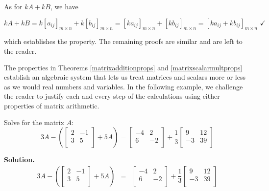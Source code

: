 \documentclass{ximera}
\begin{document}
As for $kA + kB$, we have

\[ kA + kB = k\left[a_{ij}\right]_{m \times n}+k\left[b_{ij}\right]_{m \times n} =  \left[ka_{ij}\right]_{m \times n}+\left[kb_{ij}\right]_{m \times n} = \left[ka_{ij} + kb_{ij}\right]_{m \times n} \, \, \checkmark \]

which establishes the property.  The remaining proofs are similar and are left to the reader.  


The properties in Theorems \ref{matrixadditionprops} and \ref{matrixscalarmultprops} establish an algebraic system that lets us treat matrices and scalars more or less as we would real numbers and variables.  In the following example, we challenge the reader to justify each and every step of the calculations using either properties of matrix arithmetic.

\begin{example} \label{matrixaddscalarex} Solve for the matrix $A$:  \[3A - \left(\left[ \begin{array}{rr} 2 & -1 \\ 3 & 5 \\ \end{array}\right] + 5A\right) = \left[ \begin{array}{rr} -4 & 2 \\ 6 & -2 \\ \end{array}\right] + \dfrac{1}{3} \left[ \begin{array}{rr} 9 & 12 \\ -3 & 39 \\ \end{array}\right] \]
\newpage

{\bf Solution.} \[ \begin{array}{rcl}

3A - \left(\left[ \begin{array}{rr} 2 & -1 \\ 3 & 5 \\ \end{array}\right] + 5A\right) & = & \left[ \begin{array}{rr} -4 & 2 \\ 6 & -2 \\ \end{array}\right] + \dfrac{1}{3} \left[ \begin{array}{rr} 9 & 12 \\ -3 & 39 \\ \end{array}\right]  \\  




\end{array}\]
\end{example}
\end{document}
